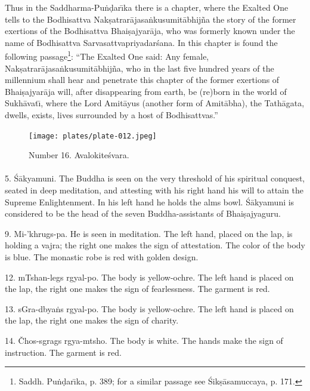 \documentclass[a4paper, 12pt, oneside]{article}
\begin{document}
Thus in the Saddharma-Pu\.{n}\d{d}ar\={\i}ka there is a chapter, where the Exalted One tells to the Bodhisattva Nak\d{s}atrar\={a}jasa\.{n}kusumit\={a}bhij\~{n}a the story of the former exertions of the Bodhisattva Bhai\d{s}ajyar\={a}ja, who was formerly known under the name of Bodhisattva Sarvasattvapriyadar\'{s}ana. In this chapter is found the following passage\footnote{Saddh. Pu\.{n}\d{d}ar\={\i}ka, p. 389; for a similar passage see \'{S}ik\d{s}\={a}samuccaya, p. 171.}: ``The Exalted One said: Any female, Nak\d{s}atrar\={a}jasa\.{n}kusumit\={a}bhij\~{n}a, who in the last five hundred years of the millennium shall hear and penetrate this chapter of the former exertions of Bhai\d{s}ajyar\={a}ja will, after disappearing from earth, be (re)born in the world of Sukh\={a}vat\={\i}, where the Lord Amit\={a}yus (another form of Amit\={a}bha), the Tath\={a}gata, dwells, exists, lives surrounded by a host of Bodhisattvas.''

\clearpage
\vspace*{\fill}
\begin{figure}[H]
\centering
\texttt{[image: plates/plate-012.jpeg]}
\caption*{Number 16. Avalokite\'{s}vara.}
\end{figure}
\vspace*{\fill}
\clearpage
\paragraph{}
5. \'{S}\={a}kyamuni. The Buddha is seen on the very threshold of his spiritual conquest, seated in deep meditation, and attesting with his right hand his will to attain the Supreme Enlightenment. In his left hand he holds the alms bowl. \'{S}\={a}kyamuni is considered to be the head of the seven Buddha-assistants of Bhai\d{s}ajyaguru.

9. Mi-'khrugs-pa. He is seen in meditation. The left hand, placed on the lap, is holding a vajra; the right one makes the sign of attestation. The color of the body is blue. The monastic robe is red with golden design.

12. mTshan-legs rgyal-po. The body is yellow-ochre. The left hand is placed on the lap, the right one makes the sign of fearlessness. The garment is red.

13. sGra-dbya\.{n}s rgyal-po. The body is yellow-ochre. The left hand is placed on the lap, the right one makes the sign of charity.

14. Čhos-sgrags rgya-mtsho. The body is white. The hands make the sign of instruction. The garment is red.
\end{document}
